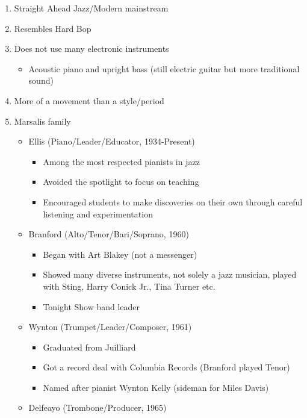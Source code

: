 \documentclass[]{article}
\providecommand{\tightlist}{%
  \setlength{\itemsep}{0pt}\setlength{\parskip}{0pt}}
\begin{document}
\begin{enumerate}
\def\labelenumi{\arabic{enumi}.}
\tightlist
\item
  Straight Ahead Jazz/Modern mainstream
\item
  Resembles Hard Bop
\item
  Does not use many electronic instruments

  \begin{itemize}
  \tightlist
  \item
    Acoustic piano and upright bass (still electric guitar but more
    traditional sound)
  \end{itemize}
\item
  More of a movement than a style/period
\item
  Marsalis family

  \begin{itemize}
  \tightlist
  \item
    Ellis (Piano/Leader/Educator, 1934-Present)

    \begin{itemize}
    \tightlist
    \item
      Among the most respected pianists in jazz
    \item
      Avoided the spotlight to focus on teaching
    \item
      Encouraged students to make discoveries on their own through
      careful listening and experimentation
    \end{itemize}
  \item
    Branford (Alto/Tenor/Bari/Soprano, 1960)

    \begin{itemize}
    \tightlist
    \item
      Began with Art Blakey (not a messenger)
    \item
      Showed many diverse instruments, not solely a jazz musician,
      played with Sting, Harry Conick Jr., Tina Turner etc.
    \item
      Tonight Show band leader
    \end{itemize}
  \item
    Wynton (Trumpet/Leader/Composer, 1961)

    \begin{itemize}
    \tightlist
    \item
      Graduated from Juilliard
    \item
      Got a record deal with Columbia Records (Branford played Tenor)
    \item
      Named after pianist Wynton Kelly (sideman for Miles Davis)
    \end{itemize}
  \item
    Delfeayo (Trombone/Producer, 1965)


\end{itemize}
\end{enumerate}
\end{document}
